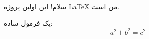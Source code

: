 \documentclass{article}   %
\begin{document}
سلام! این اولین پروژه \LaTeX{} من است.

یک فرمول ساده:
\[
a^2 + b^2 = c^2
\]
\end{document}
